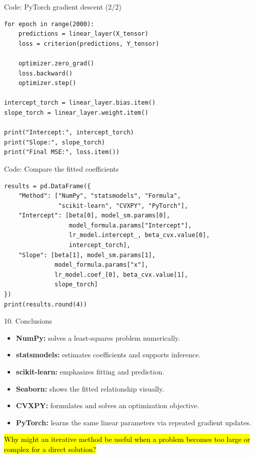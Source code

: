 \documentclass[aspectratio=43,11pt]{beamer}
\begin{document}
\begin{frame}[fragile]{Code: PyTorch gradient descent (2/2)}
\small
\color{maroon}
\begin{verbatim}
for epoch in range(2000):
    predictions = linear_layer(X_tensor)
    loss = criterion(predictions, Y_tensor)

    optimizer.zero_grad()
    loss.backward()
    optimizer.step()

intercept_torch = linear_layer.bias.item()
slope_torch = linear_layer.weight.item()

print("Intercept:", intercept_torch)
print("Slope:", slope_torch)
print("Final MSE:", loss.item())
\end{verbatim}
\end{frame}

\begin{frame}[fragile]{Code: Compare the fitted coefficients}
\footnotesize
\color{maroon}
\begin{verbatim}
results = pd.DataFrame({
    "Method": ["NumPy", "statsmodels", "Formula",
               "scikit-learn", "CVXPY", "PyTorch"],
    "Intercept": [beta[0], model_sm.params[0],
                  model_formula.params["Intercept"],
                  lr_model.intercept_, beta_cvx.value[0],
                  intercept_torch],
    "Slope": [beta[1], model_sm.params[1],
              model_formula.params["x"],
              lr_model.coef_[0], beta_cvx.value[1],
              slope_torch]
})
print(results.round(4))
\end{verbatim}
\end{frame}

\begin{frame}{10. Conclusions}
\begin{itemize}
\item \textbf{NumPy:} solves a least-squares problem numerically.
\item \textbf{statsmodels:} estimates coefficients and supports inference.
\item \textbf{scikit-learn:} emphasizes fitting and prediction.
\item \textbf{Seaborn:} shows the fitted relationship visually.
\item \textbf{CVXPY:} formulates and solves an optimization objective.
\item \textbf{PyTorch:} learns the same linear parameters via repeated gradient updates.
\end{itemize}
\medskip
\hl{Why might an iterative method be useful when a problem becomes too large or complex for a direct solution?}
\end{frame}
\end{document}
